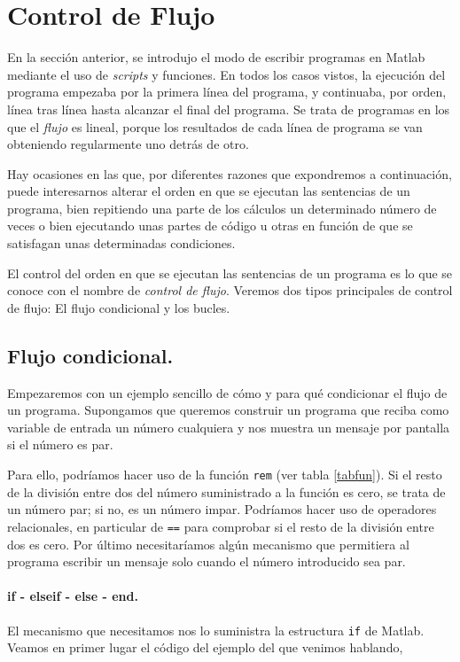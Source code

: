  




\section{Control de Flujo} 
En la sección anterior, se introdujo el modo de escribir programas en Matlab mediante el uso de 	\emph{scripts} y funciones. En todos los casos vistos, la ejecución del programa empezaba por la primera línea del programa, y continuaba, por orden, línea tras línea hasta alcanzar el final del programa. Se trata de programas en los que el \emph{flujo} es lineal, porque los resultados de cada línea de programa se van obteniendo regularmente uno detrás de otro. 

Hay ocasiones en las que, por diferentes razones que expondremos a continuación, puede interesarnos alterar el orden en que se ejecutan las sentencias de un programa, bien repitiendo una parte de los cálculos un determinado número de veces o bien ejecutando unas partes de código u otras en función de que se satisfagan unas determinadas condiciones.

El control del orden en que se ejecutan las sentencias de un programa es lo que se conoce con el nombre de \emph{control de flujo}. Veremos dos tipos principales de control de flujo: El flujo condicional y los bucles.
\subsection{Flujo condicional.}
Empezaremos con un ejemplo sencillo de cómo y para qué condicionar el flujo de un programa. Supongamos que queremos construir un programa que reciba como variable de entrada un número cualquiera y nos muestra un mensaje por pantalla si el número es par.

Para ello, podríamos hacer uso de la función \texttt{rem} (ver tabla \ref{tabfun}). Si el resto de la división entre dos del número suministrado a la función es cero, se trata de un número par; si no, es un número impar. Podríamos hacer uso de operadores relacionales, en particular de \texttt{==} para comprobar si el resto de la división entre dos es cero. Por último necesitaríamos algún mecanismo que permitiera al programa escribir un mensaje solo cuando el número introducido sea par.

\paragraph{if - elseif - else - end.} El mecanismo que necesitamos nos lo suministra la estructura \texttt{if} de Matlab. Veamos en primer lugar el código del ejemplo del que venimos hablando,

